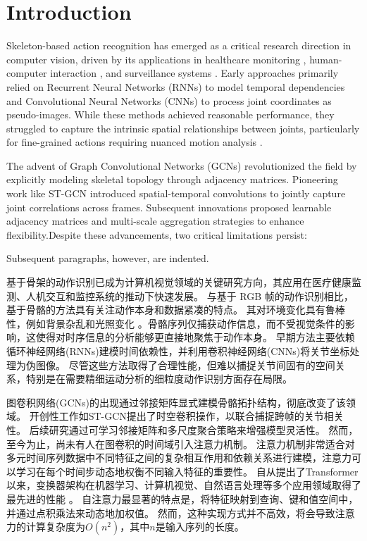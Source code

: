 \section{Introduction}

Skeleton-based action recognition has emerged as a critical research 
direction in computer vision, driven by its applications in healthcare 
monitoring \cite{ref1}, human-computer interaction \cite{ref2}, and surveillance systems \cite{ref3}.
Early approaches primarily relied on Recurrent Neural Networks (RNNs) \cite{ref4,ref5} 
to model temporal dependencies and Convolutional Neural Networks (CNNs) \cite{ref6}
to process joint coordinates as pseudo-images. While these methods achieved 
reasonable performance, they struggled to capture the intrinsic spatial 
relationships between joints, particularly for fine-grained actions 
requiring nuanced motion analysis \cite{ref7}.


The advent of Graph Convolutional Networks (GCNs) \cite{ref8} revolutionized the field by 
explicitly modeling skeletal topology through adjacency matrices. Pioneering 
work like ST-GCN \cite{ref7} introduced spatial-temporal convolutions to jointly 
capture joint correlations across frames. Subsequent innovations proposed 
learnable adjacency matrices \cite{ref9,ref10} and multi-scale aggregation 
strategies \cite{multiscale} to enhance flexibility.Despite these advancements, 
two critical limitations persist:

Subsequent paragraphs, however, are indented.

基于骨架的动作识别已成为计算机视觉领域的关键研究方向，其应用在医疗健康监测\cite{ref1}、人机交互\cite{ref2}和监控系统\cite{ref3}的推动下快速发展。
与基于 RGB 帧的动作识别相比，基于骨骼的方法具有关注动作本身和数据紧凑的特点\cite{skeleton-useful}。
其对环境变化具有鲁棒性，例如背景杂乱和光照变化 。骨骼序列仅捕获动作信息，而不受视觉条件的影响，这使得对时序信息的分析能够更直接地聚焦于动作本身。
早期方法主要依赖循环神经网络(RNNs)\cite{ref4,ref5}建模时间依赖性，并利用卷积神经网络(CNNs)\cite{ref6}将关节坐标处理为伪图像。
尽管这些方法取得了合理性能，但难以捕捉关节间固有的空间关系，特别是在需要精细运动分析的细粒度动作识别方面存在局限\cite{ref7}。

图卷积网络(GCNs)\cite{ref8}的出现通过邻接矩阵显式建模骨骼拓扑结构，彻底改变了该领域。
开创性工作如ST-GCN\cite{ref7}提出了时空卷积操作，以联合捕捉跨帧的关节相关性。
后续研究通过可学习邻接矩阵\cite{ref9,ref10}和多尺度聚合策略\cite{multiscale}来增强模型灵活性。
然而，至今为止，尚未有人在图卷积的时间域引入注意力机制。
注意力机制非常适合对多元时间序列数据中不同特征之间的复杂相互作用和依赖关系进行建模，注意力可以学习在每个时间步动态地权衡不同输入特征的重要性\cite{temporal-attention-useful}。
自从\cite{attention-is-all-you-need}提出了Transformer以来，变换器架构在机器学习、计算机视觉、自然语言处理等多个应用领域取得了最先进的性能
\cite{bert} \cite{radford2019language} \cite{brown2020language} \cite{chen2020generative} \cite{dosovitskiy2020image}。
自注意力最显著的特点是，将特征映射到查询、键和值空间中，并通过点积乘法来动态地加权值。
然而，这种实现方式并不高效，将会导致注意力的计算复杂度为$O(n^2)$，其中$n$是输入序列的长度。

